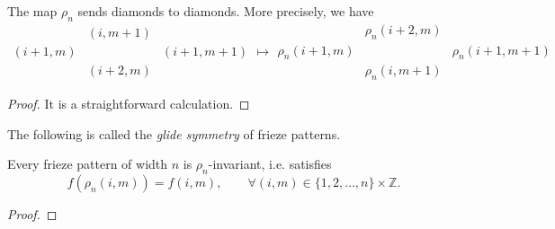 \begin{lemma}
    \label{l:glide-diamond}
    The map $\rho_n$ sends diamonds to diamonds. More precisely, we have
    \[
        \begin{matrix}
            & (i,m+1) &\\
            (i+1,m) && (i+1,m+1) \\
                & (i+2,m)
        \end{matrix} \longmapsto 
        \begin{matrix}
            & \rho_n(i+2,m) &\\
            \rho_n(i+1,m) && \rho_n(i+1,m+1) \\
                & \rho_n(i,m+1)
        \end{matrix}
    \]
\end{lemma}
\begin{proof}
    It is a straightforward calculation.
\end{proof}

The following is called the 
\textit{glide symmetry} of frieze patterns. 

\begin{proposition}
\label{prop:glide-symm}
Every frieze pattern of width $n$ is $\rho_n$-invariant, i.e. satisfies 
\[
    f(\rho_n(i,m)) = f(i,m), \qquad \forall (i,m) \in \{1,2,\ldots , n\} \times \mathbb{Z}.
\]
\end{proposition}
\begin{proof}

\end{proof}


